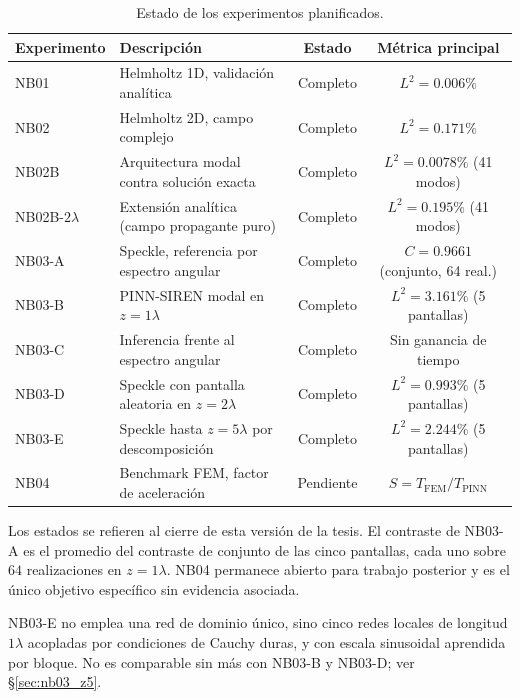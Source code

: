 \begin{table}[H]
\centering
\begin{threeparttable}
\caption{Estado de los experimentos planificados.}
\label{tab:resumen_experimentos}
\begin{tabular}{llcc}
\toprule
Experimento & Descripción & Estado & Métrica principal \\
\midrule
NB01 & Helmholtz 1D, validación analítica & Completo & $L^2 = 0.006\%$ \\
NB02 & Helmholtz 2D, campo complejo       & Completo & $L^2 = 0.171\%$ \\
NB02B & Arquitectura modal contra solución exacta & Completo & $L^2 = 0.0078\%$ (41 modos) \\
NB02B-$2\lambda$ & Extensión analítica (campo propagante puro) & Completo & $L^2 = 0.195\%$ (41 modos) \\
NB03-A & Speckle, referencia por espectro angular & Completo & $C=0.9661$ (conjunto, 64 real.) \\
NB03-B & PINN-SIREN modal en $z=1\lambda$ & Completo & $L^2 = 3.161\%$ (5 pantallas) \\
NB03-C & Inferencia frente al espectro angular & Completo & Sin ganancia de tiempo \\
NB03-D & Speckle con pantalla aleatoria en $z=2\lambda$ & Completo & $L^2 = 0.993\%$ (5 pantallas) \\
NB03-E & Speckle hasta $z=5\lambda$ por descomposición & Completo & $L^2 = 2.244\%$ (5 pantallas)\tnote{c} \\
NB04 & Benchmark FEM, factor de aceleración & Pendiente & $S = T_\text{FEM}/T_\text{PINN}$ \\
\bottomrule
\end{tabular}
\begin{tablenotes}\small
    \item Los estados se refieren al cierre de esta versión de la tesis. El
    contraste de NB03-A es el promedio del contraste de conjunto de las cinco
    pantallas, cada uno sobre $64$ realizaciones en $z=1\lambda$. NB04
    permanece abierto para trabajo posterior y es el único objetivo específico
    sin evidencia asociada.
    \item[c] NB03-E no emplea una red de dominio único, sino cinco redes
    locales de longitud $1\lambda$ acopladas por condiciones de Cauchy duras, y
    con escala sinusoidal aprendida por bloque. No es comparable sin más con
    NB03-B y NB03-D; ver §\ref{sec:nb03_z5}.
\end{tablenotes}
\end{threeparttable}
\end{table}

